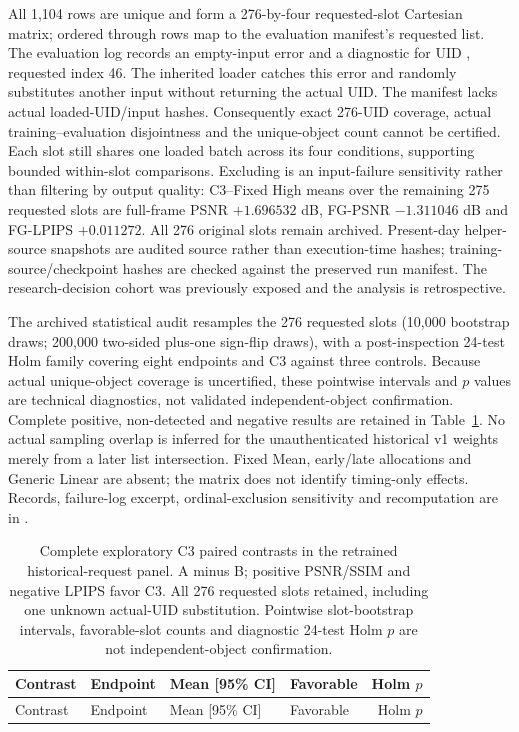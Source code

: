 \documentclass[11pt]{article}
\begin{document}
All 1,104 rows are unique and form a 276-by-four requested-slot Cartesian matrix; ordered  through  rows map to the evaluation manifest's requested list. The evaluation log records an empty-input error and a  diagnostic for UID , requested index 46. The inherited loader catches this error and randomly substitutes another input without returning the actual UID. The manifest lacks actual loaded-UID/input hashes. Consequently exact 276-UID coverage, actual training--evaluation disjointness and the unique-object count cannot be certified. Each slot still shares one loaded batch across its four conditions, supporting bounded within-slot comparisons. Excluding  is an input-failure sensitivity rather than filtering by output quality: C3--Fixed High means over the remaining 275 requested slots are full-frame PSNR $+1.696532$ dB, FG-PSNR $-1.311046$ dB and FG-LPIPS $+0.011272$. All 276 original slots remain archived. Present-day helper-source snapshots are audited source rather than execution-time hashes; training-source/checkpoint hashes are checked against the preserved run manifest. The research-decision cohort was previously exposed and the analysis is retrospective.

The archived statistical audit resamples the 276 requested slots (10,000 bootstrap draws; 200,000 two-sided plus-one sign-flip draws), with a post-inspection 24-test Holm family covering eight endpoints and C3 against three controls. Because actual unique-object coverage is uncertified, these pointwise intervals and $p$ values are technical diagnostics, not validated independent-object confirmation. Complete positive, non-detected and negative results are retained in Table~\ref{tab:supp-original276}. No actual sampling overlap is inferred for the unauthenticated historical v1 weights merely from a later list intersection. Fixed Mean, early/late allocations and Generic Linear are absent; the matrix does not identify timing-only effects. Records, failure-log excerpt, ordinal-exclusion sensitivity and recomputation are in .

\begingroup\scriptsize
\begin{longtable}{p{3.0cm}p{2.7cm}p{5.0cm}lr}
\caption{Complete exploratory C3 paired contrasts in the retrained historical-request panel. A minus B; positive PSNR/SSIM and negative LPIPS favor C3. All 276 requested slots retained, including one unknown actual-UID substitution. Pointwise slot-bootstrap intervals, favorable-slot counts and diagnostic 24-test Holm $p$ are not independent-object confirmation.}\label{tab:supp-original276}\\
\toprule Contrast & Endpoint & Mean [95\% CI] & Favorable & Holm $p$ \\
\midrule\endfirsthead
\toprule Contrast & Endpoint & Mean [95\% CI] & Favorable & Holm $p$ \\
\midrule\endhead

\bottomrule
\end{longtable}
\endgroup
\end{document}
